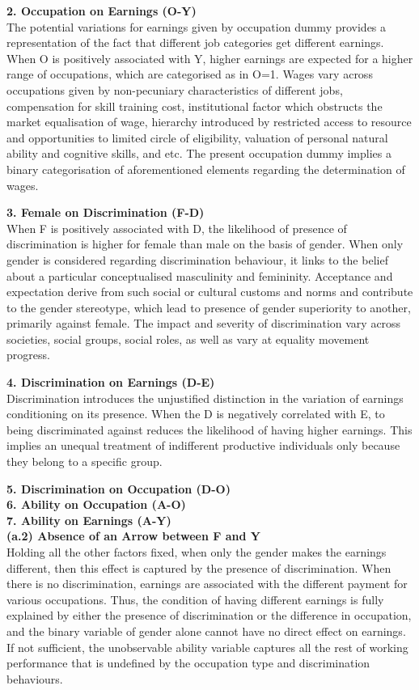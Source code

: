 \documentclass[a4paper,12pt,oneside,English]{article}
\begin{document}
\textbf{2. Occupation on Earnings (O-Y)}\\
The potential variations for earnings given by occupation dummy provides a representation of the fact that different job categories get different earnings. When O is positively associated with Y, higher earnings are expected for a higher range of occupations, which are categorised as in O=1. Wages vary across occupations given by non-pecuniary characteristics of different jobs, compensation for skill training cost, institutional factor which obstructs the market equalisation of wage, hierarchy introduced by restricted access to resource and opportunities to limited circle of eligibility, valuation of personal natural ability and cognitive skills, and etc. The present occupation dummy implies a binary categorisation of aforementioned elements regarding the determination of wages.

\textbf{3. Female on Discrimination (F-D)}\\
When F is positively associated with D, the likelihood of presence of discrimination is higher for female than male on the basis of gender. When only gender is considered regarding discrimination behaviour, it links to the belief about a particular conceptualised masculinity and femininity. Acceptance and expectation derive from such social or cultural customs and norms and contribute to the gender stereotype, which lead to presence of gender superiority to another, primarily against female. The impact and severity of discrimination vary across societies, social groups, social roles, as well as vary at equality movement progress. 

\textbf{4. Discrimination on Earnings (D-E)}\\
Discrimination introduces the unjustified distinction in the variation of earnings conditioning on its presence. When the D is negatively correlated with E, to being discriminated against reduces the likelihood of having higher earnings. This implies an unequal treatment of indifferent productive individuals only because they belong to a specific group.

\textbf{5. Discrimination on Occupation (D-O)}\\
\textbf{6. Ability on Occupation (A-O)}\\
\textbf{7. Ability on Earnings (A-Y)}\\

\textbf{(a.2) Absence of an Arrow between F and Y}\\
Holding all the other factors fixed, when only the gender makes the earnings different, then this effect is captured by the presence of discrimination. When there is no discrimination, earnings are associated with the different payment for various occupations. Thus, the condition of having different earnings is fully explained by either the presence of discrimination or the difference in occupation, and the binary variable of gender alone cannot have no direct effect on earnings. If not sufficient, the unobservable ability variable captures all the rest of working performance that is undefined by the occupation type and discrimination behaviours.
\end{document}
